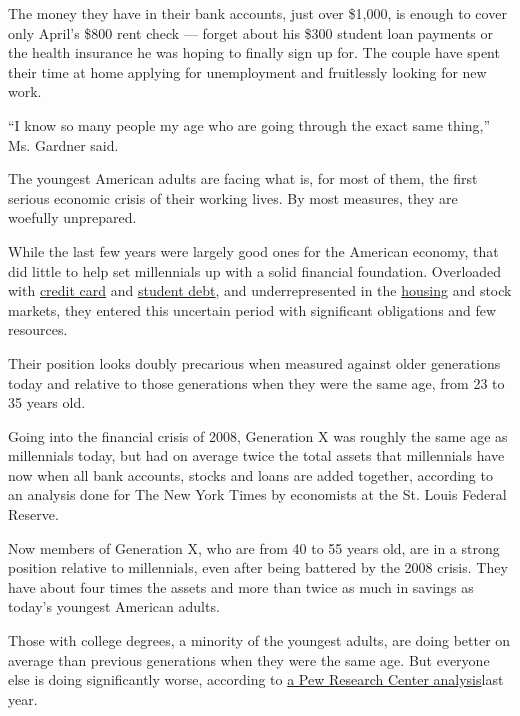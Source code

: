 The money they have in their bank accounts, just over \$1,000, is enough
to cover only April's \$800 rent check --- forget about his \$300
student loan payments or the health insurance he was hoping to finally
sign up for. The couple have spent their time at home applying for
unemployment and fruitlessly looking for new work.

``I know so many people my age who are going through the exact same
thing,'' Ms. Gardner said.

The youngest American adults are facing what is, for most of them, the
first serious economic crisis of their working lives. By most measures,
they are woefully unprepared.

While the last few years were largely good ones for the American
economy, that did little to help set millennials up with a solid
financial foundation. Overloaded with
\href{https://www.buzzfeednews.com/article/venessawong/credit-card-debt-what-people-buy}{credit
card} and
\href{https://www.nytimes3xbfgragh.onion/2018/07/11/your-money/student-loan-debt-parents.html}{student
debt}, and underrepresented in the
\href{https://www.nytimes3xbfgragh.onion/2018/05/25/business/how-student-debt-can-ruin-home-buying-dreams.html}{housing}
and stock markets, they entered this uncertain period with significant
obligations and few resources.

Their position looks doubly precarious when measured against older
generations today and relative to those generations when they were the
same age, from 23 to 35 years old.

Going into the financial crisis of 2008, Generation X was roughly the
same age as millennials today, but had on average twice the total assets
that millennials have now when all bank accounts, stocks and loans are
added together, according to an analysis done for The New York Times by
economists at the St. Louis Federal Reserve.

Now members of Generation X, who are from 40 to 55 years old, are in a
strong position relative to millennials, even after being battered by
the 2008 crisis. They have about four times the assets and more than
twice as much in savings as today's youngest American adults.

Those with college degrees, a minority of the youngest adults, are doing
better on average than previous generations when they were the same age.
But everyone else is doing significantly worse, according to
\href{https://www.pewsocialtrends.org/essay/millennial-life-how-young-adulthood-today-compares-with-prior-generations/}{a
Pew Research Center analysis}last year.

